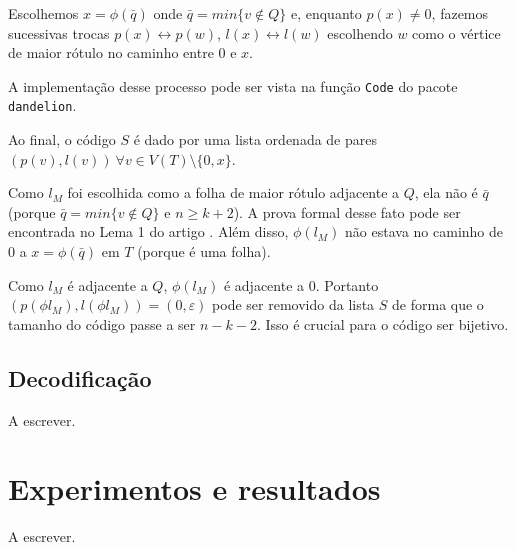 \begin{algorithm}
\begin{step}
    Escolhemos $x = \phi(\bar{q})$ onde $\bar{q} = min\{v \not \in Q\}$ e, enquanto $p(x) \neq 0$, fazemos sucessivas trocas $p(x) \leftrightarrow p(w)$, $l(x) \leftrightarrow l(w)$ escolhendo $w$ como o vértice de maior rótulo no caminho entre $0$ e $x$.

    A implementação desse processo pode ser vista na função {\tt Code} do pacote {\tt dandelion}.

    Ao final, o código $S$ é dado por uma lista ordenada de pares $(p(v), l(v)) \  \forall v \in V(T) \setminus \{0, x\}$.
  \end{step}

  \begin{step}
    Como $l_M$ foi escolhida como a folha de maior rótulo adjacente a $Q$, ela não é $\bar{q}$ (porque $\bar{q} = min\{v \not \in Q\}$ e $n \geq k + 2$). A prova formal desse fato pode ser encontrada no Lema 1 do artigo \cite{caminiti}. Além disso, $\phi(l_M)$ não estava no caminho de $0$ a $x = \phi(\bar{q})$ em $T$ (porque é uma folha).

    Como $l_M$ é adjacente a $Q$, $\phi(l_M)$ é adjacente a $0$. Portanto $(p(\phi{l_M}), l(\phi{l_M})) = (0, \varepsilon)$ pode ser removido da lista $S$ de forma que o tamanho do código passe a ser $n - k - 2$. Isso é crucial para o código ser bijetivo.
  \end{step}
\end{algorithm}

\subsection{Decodificação}

A escrever. %

\section{Experimentos e resultados}

A escrever. %


